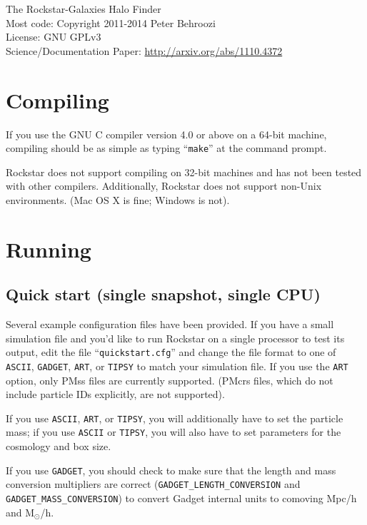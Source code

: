 \documentclass[12pt]{article}
\begin{document}
\vspace{-1ex}
\noindent{}The Rockstar-Galaxies Halo Finder\\
\noindent{}Most code: Copyright \textcopyright{}2011-2014 Peter Behroozi\\
\noindent{}License: GNU GPLv3\\
\noindent{}Science/Documentation Paper: \url{http://arxiv.org/abs/1110.4372}\\

\tableofcontents
\newcommand{\ttt}[1]{\texttt{#1}}

\section{Compiling}
   If you use the GNU C compiler version 4.0 or above on a 64-bit machine,
   compiling should be as simple as typing ``\texttt{make}'' at the command prompt.

   Rockstar does not support compiling on 32-bit machines and has not been
   tested with other compilers.  Additionally, Rockstar does not support
   non-Unix environments.  (Mac OS X is fine; Windows is not).

\section{Running}
   \subsection{Quick start (single snapshot, single CPU)}
      Several example configuration files have been provided.  If you have a
      small simulation file and you'd like to run Rockstar on a single processor
      to test its output, edit the file ``\texttt{quickstart.cfg}'' and change the file
      format to one of \texttt{ASCII}, \texttt{GADGET}, \texttt{ART}, or \texttt{TIPSY} to match your
      simulation file.  If you use the \texttt{ART} option, only PMss files are
      currently supported.  (PMcrs files, which do not include particle IDs
      explicitly, are not supported).

      If you use \texttt{ASCII}, \ttt{ART}, or \ttt{TIPSY}, you will additionally have to set
      the particle mass; if you use \ttt{ASCII} or \ttt{TIPSY}, you will also have to
      set parameters for the cosmology and box size.

      If you use \texttt{GADGET}, you should check to make sure that the length
      and mass conversion multipliers are correct (\ttt{GADGET\_LENGTH\_CONVERSION} and
      \ttt{GADGET\_MASS\_CONVERSION}) to convert Gadget internal units to comoving Mpc/h
      and M$_\odot$/h.
\end{document}
